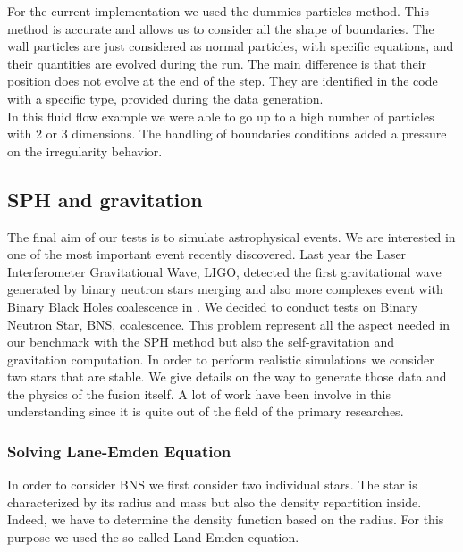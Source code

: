 For the current implementation we used the dummies particles method.
This method is accurate and allows us to consider all the shape of boundaries.
The wall particles are just considered as normal particles, with specific equations, and their quantities are evolved during the run. 
The main difference is that their position does not evolve at the end of the step.
They are identified in the code with a specific type, provided during the data generation.\\ 

In this fluid flow example we were able to go up to a high number of particles with 2 or 3 dimensions. 
The handling of boundaries conditions added a pressure on the irregularity behavior. 

\subsection{SPH and gravitation}

The final aim of our tests is to simulate astrophysical events. 
We are interested in one of the most important event recently discovered. 
Last year the Laser Interferometer Gravitational Wave, LIGO, detected the first gravitational wave generated by binary neutron stars merging \cite{abbott2017gw170817} and also more complexes event with Binary Black Holes coalescence in \cite{abbott2017gw170814}.
We decided to conduct tests on Binary Neutron Star, BNS, coalescence. 
This problem represent all the aspect needed in our benchmark with the SPH method but also the self-gravitation and gravitation computation. 
In order to perform realistic simulations we consider two stars that are stable. 
We give details on the way to generate those data and the physics of the fusion itself. 
A lot of work have been involve in this understanding since it is quite out of the field of the primary researches. 

\subsubsection{Solving Lane-Emden Equation}

In order to consider BNS we first consider two individual stars. 
The star is characterized by its radius and mass but also the density repartition inside.
Indeed, we have to determine the density function based on the radius. 
For this purpose we used the so called Land-Emden equation.\\

